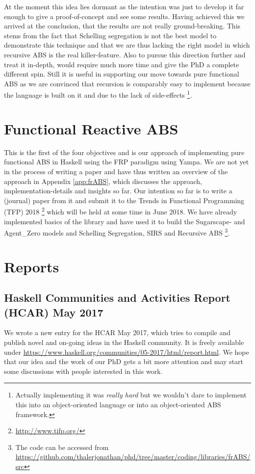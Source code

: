 At the moment this idea lies dormant as the intention was just to develop it far enough to give a proof-of-concept and see some results. Having achieved this we arrived at the conclusion, that the results are not really ground-breaking. This stems from the fact that Schelling segregation is not the best model to demonstrate this technique and that we are thus lacking the right model in which recursive ABS is the real killer-feature. Also to pursue this direction further and treat it in-depth, would require much more time and give the PhD a complete different spin. Still it is useful in supporting our move towards pure functional ABS as we are convinced that recursion is comparably easy to implement because the language is built on it and due to the lack of side-effects \footnote{Actually implementing it was \textit{really hard} but we wouldn't dare to implement this into an object-oriented language or into an object-oriented ABS framework.}.

\section{Functional Reactive ABS}
This is the first of the four objectives and is our approach of implementing pure functional ABS in Haskell using the FRP paradigm using Yampa. We are not yet in the process of writing a paper and have thus written an overview of the approach in Appendix \ref{app:frABS}, which discusses the approach, implementation-details and insights so far. 
Our intention so far is to write a (journal) paper from it and submit it to the Trends in Functional Programming (TFP) 2018 \footnote{\url{http://www.tifp.org/}} which will be held at some time in June 2018.
We have already implemented basics of the library and have used it to build the Sugarscape- and Agent\_Zero models and Schelling Segregation, SIRS and Recursive ABS \footnote{The code can be accessed from \url{https://github.com/thalerjonathan/phd/tree/master/coding/libraries/frABS/src}}.

\section{Reports}
\subsection{Haskell Communities and Activities Report (HCAR) May 2017}
We wrote a new entry for the HCAR May 2017, which tries to compile and publish novel and on-going ideas in the Haskell community. It is freely available under \url{https://www.haskell.org/communities/05-2017/html/report.html}. We hope that our idea and the work of our PhD gets a bit more attention and may start some discussions with people interested in this work.

